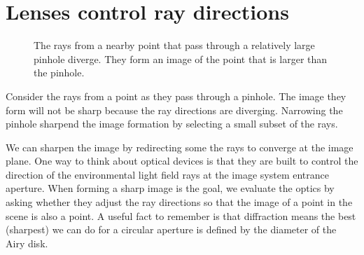 \documentclass[
  letterpaper,
]{book}
\begin{document}
\section{Lenses control ray
directions}\label{lenses-control-ray-directions}

\begin{figure}


\caption{\label{fig-pinhole-rays}The rays from a nearby point that pass
through a relatively large pinhole diverge. They form an image of the
point that is larger than the pinhole.}

\end{figure}%

Consider the rays from a point as they pass through a pinhole. The image
they form will not be sharp because the ray directions are diverging.
Narrowing the pinhole sharpend the image formation by selecting a small
subset of the rays.

We can sharpen the image by redirecting some the rays to converge at the
image plane. One way to think about optical devices is that they are
built to control the direction of the environmental light field rays at
the image system entrance aperture. When forming a sharp image is the
goal, we evaluate the optics by asking whether they adjust the ray
directions so that the image of a point in the scene is also a point. A
useful fact to remember is that diffraction means the best (sharpest) we
can do for a circular aperture is defined by the diameter of the Airy
disk.
\end{document}
